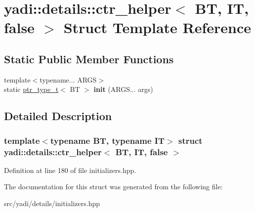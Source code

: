 \hypertarget{structyadi_1_1details_1_1ctr__helper_3_01_b_t_00_01_i_t_00_01false_01_4}{}\section{yadi\+:\+:details\+:\+:ctr\+\_\+helper$<$ BT, IT, false $>$ Struct Template Reference}
\label{structyadi_1_1details_1_1ctr__helper_3_01_b_t_00_01_i_t_00_01false_01_4}
\subsection*{Static Public Member Functions}
\begin{DoxyCompactItemize}
\item 
\mbox{\label{structyadi_1_1details_1_1ctr__helper_3_01_b_t_00_01_i_t_00_01false_01_4_a4a2cfcc0cdaa40eeccc054b8b5fc5dcd}} 
{\footnotesize template$<$typename... A\+R\+GS$>$ }\\static \hyperlink{namespaceyadi_a92290eb27cd90666aa87b17d854af9fe}{ptr\+\_\+type\+\_\+t}$<$ BT $>$ {\bfseries init} (A\+R\+G\+S... args)
\end{DoxyCompactItemize}


\subsection{Detailed Description}
\subsubsection*{template$<$typename BT, typename IT$>$\newline
struct yadi\+::details\+::ctr\+\_\+helper$<$ B\+T, I\+T, false $>$}



Definition at line 180 of file initializers.\+hpp.



The documentation for this struct was generated from the following file\+:\begin{DoxyCompactItemize}
\item 
src/yadi/details/initializers.\+hpp\end{DoxyCompactItemize}
